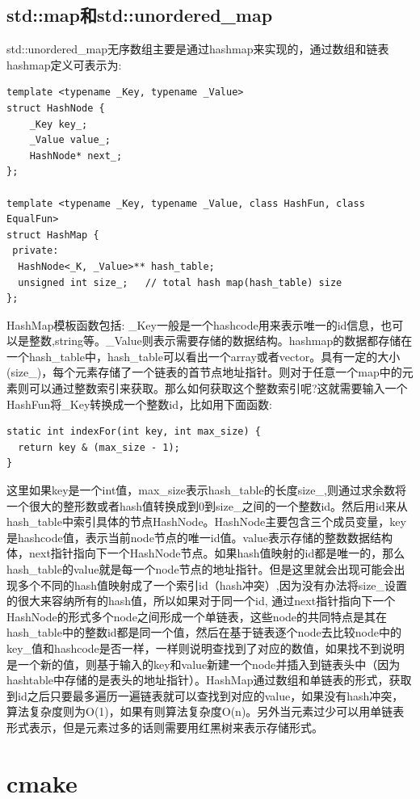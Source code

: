 \documentclass[12pt]{book}
\begin{document}
\subsection{std::map和std::unordered\_map}
std::unordered\_map无序数组主要是通过hashmap来实现的，通过数组和链表hashmap定义可表示为:
\begin{lstlisting}
template <typename _Key, typename _Value>
struct HashNode {
	_Key key_;
	_Value value_;
	HashNode* next_;
};

template <typename _Key, typename _Value, class HashFun, class EqualFun>
struct HashMap {
 private:
  HashNode<_K, _Value>** hash_table;
  unsigned int size_;   // total hash map(hash_table) size
};
\end{lstlisting}
HashMap模板函数包括: \_Key一般是一个hashcode用来表示唯一的id信息，也可以是整数,string等。\_Value则表示需要存储的数据结构。hashmap的数据都存储在一个hash\_table中，hash\_table可以看出一个array或者vector。具有一定的大小(size\_)，每个元素存储了一个链表的首节点地址指针。则对于任意一个map中的元素则可以通过整数索引来获取。那么如何获取这个整数索引呢?这就需要输入一个HashFun将\_Key转换成一个整数id，比如用下面函数:
\begin{lstlisting}
static int indexFor(int key, int max_size) {  
  return key & (max_size - 1);
}
\end{lstlisting}
这里如果key是一个int值，max\_size表示hash\_table的长度size\_,则通过求余数将一个很大的整形数或者hash值转换成到0到size\_之间的一个整数id。然后用id来从hash\_table中索引具体的节点HashNode。HashNode主要包含三个成员变量，key是hashcode值，表示当前node节点的唯一id值。value表示存储的整数数据结构体，next指针指向下一个HashNode节点。如果hash值映射的id都是唯一的，那么hash\_table的value就是每一个node节点的地址指针。但是这里就会出现可能会出现多个不同的hash值映射成了一个索引id（hash冲突）,因为没有办法将size\_设置的很大来容纳所有的hash值，所以如果对于同一个id, 通过next指针指向下一个HashNode的形式多个node之间形成一个单链表，这些node的共同特点是其在hash\_table中的整数id都是同一个值，然后在基于链表逐个node去比较node中的key\_值和hashcode是否一样，一样则说明查找到了对应的数值，如果找不到说明是一个新的值，则基于输入的key和value新建一个node并插入到链表头中（因为hashtable中存储的是表头的地址指针）。HashMap通过数组和单链表的形式，获取到id之后只要最多遍历一遍链表就可以查找到对应的value，如果没有hash冲突，算法复杂度则为O(1)，如果有则算法复杂度O(n)。另外当元素过少可以用单链表形式表示，但是元素过多的话则需要用红黑树来表示存储形式。

\section{cmake}
\end{document}
